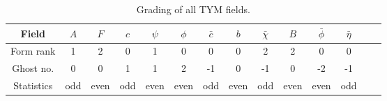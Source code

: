 \documentclass[main.tex]{subfiles}
\begin{document}
\begin{table}[htpb]
  \caption{Grading of all TYM fields.}%
  \label{tab:tym-grading}
  \begin{tabular}{cccccccccccccc}
    \toprule
    Field      & $A$ & $F$  & $c$ & $\psi$ & $\phi$ & $\bar{c}$ & $b$  & $\bar{\chi}$ & $B$  & $\bar{\phi}$ & $\bar{\eta}$ \\
    \midrule
    Form rank  & 1   & 2    & 0   & 1      & 0      & 0         & 0    & 2            & 2    & 0            & 0            \\
    Ghost no.  & 0   & 0    & 1   & 1      & 2      & -1        & 0    & -1           & 0    & -2           & -1           \\
    Statistics & odd & even & odd & even   & even   & odd       & even & odd          & even & even         & odd          \\
    \bottomrule
  \end{tabular}
\end{table}
\end{document}
